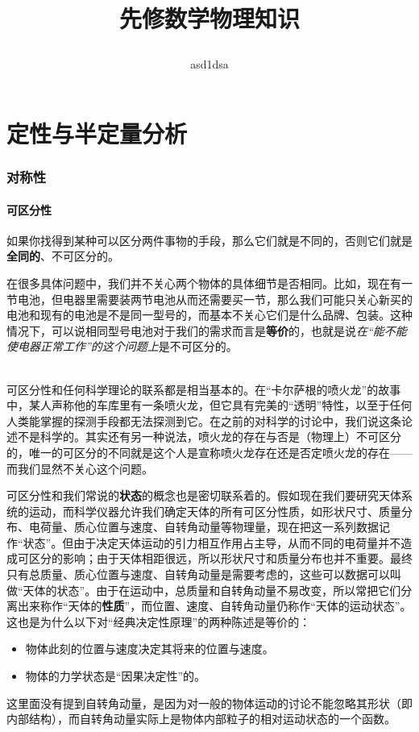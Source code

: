 \documentclass[10pt]{article}
\title{
	\begin{center}
		{\Huge 先修数学物理知识}%
	\end{center}
}
\author{asd1dsa}
\affiliation{
哈尔滨工业大学（威海）\\
理学院
}
\begin{document}
	\maketitle
	\flushbottom
	\newpage
	\pagestyle{fancynotes}
	\part{定性与半定量分析}
		\section{对称性}
			\subsection{可区分性}
				如果你找得到某种可以区分两件事物的手段，那么它们就是不同的，否则它们就是\textbf{全同的}、不可区分的。

				在很多具体问题中，我们并不关心两个物体的具体细节是否相同。比如，现在有一节电池，但电器里需要装两节电池从而还需要买一节，那么我们可能只关心新买的电池和现有的电池是不是同一型号的，而基本不关心它们是什么品牌、包装。这种情况下，可以说相同型号电池对于我们的需求而言是\textbf{等价}的，也就是说\textit{在“能不能使电器正常工作”的这个问题上}是不可区分的。
				
				~{}\\

				可区分性和任何科学理论的联系都是相当基本的。在“卡尔萨根的喷火龙”的故事中，某人声称他的车库里有一条喷火龙，但它具有完美的“透明”特性，以至于任何人类能掌握的探测手段都无法探测到它。在之前的对科学的讨论中，我们说这条论述不是科学的。其实还有另一种说法，喷火龙的存在与否是（物理上）不可区分的，唯一的可区分的不同就是这个人是宣称喷火龙存在还是否定喷火龙的存在——而我们显然不关心这个问题。

				可区分性和我们常说的\textbf{状态}的概念也是密切联系着的。假如现在我们要研究天体系统的运动，而科学仪器允许我们确定天体的所有可区分性质，如形状尺寸、质量分布、电荷量、质心位置与速度、自转角动量等物理量，现在把这一系列数据记作“状态”。但由于决定天体运动的引力相互作用占主导，从而不同的电荷量并不造成可区分的影响；由于天体相距很远，所以形状尺寸和质量分布也并不重要。最终只有总质量、质心位置与速度、自转角动量是需要考虑的，这些可以数据可以叫做“天体的状态”。由于在运动中，总质量和自转角动量不易改变，所以常把它们分离出来称作“天体的\textbf{性质}”，而位置、速度、自转角动量仍称作“天体的运动状态”。这也是为什么以下对“经典决定性原理”的两种陈述是等价的：
				\begin{itemize}
					\item 物体此刻的位置与速度决定其将来的位置与速度。
					\item 物体的力学状态是“因果决定性”的。
				\end{itemize}
				这里面没有提到自转角动量，是因为对一般的物体运动的讨论不能忽略其形状（即内部结构），而自转角动量实际上是物体内部粒子的相对运动状态的一个函数。
\end{document}
